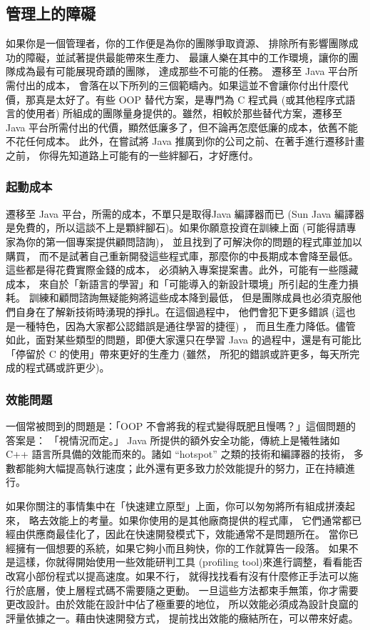 \subsection{管理上的障礙}
如果你是一個管理者，你的工作便是為你的團隊爭取資源、
排除所有影響團隊成功的障礙，並試著提供最能帶來生產力、
最讓人樂在其中的工作環境，讓你的團隊成為最有可能展現奇蹟的團隊，
達成那些不可能的任務。 遷移至 Java 平台所需付出的成本，
會落在以下所列的三個範疇內。如果這並不會讓你付出什麼代價，那真是太好了。有些
OOP 替代方案，是專門為 C 程式員 (或其他程序式語言的使用者)
所組成的團隊量身提供的。雖然，相較於那些替代方案，遷移至 Java
平台所需付出的代價，顯然低廉多了，但不論再怎麼低廉的成本，依舊不能不花任何成本。
此外，在嘗試將 Java 推廣到你的公司之前、在著手進行遷移計畫之前，
你得先知道路上可能有的一些絆腳石，才好應付。
\subsubsection{起動成本}
遷移至 Java 平台，所需的成本，不單只是取得Java 編譯器而已
(Sun Java 編譯器是免費的，所以這談不上是顆絆腳石)。如果你願意投資在訓練上面
(可能得請專家為你的第一個專案提供顧問諮詢)，
並且找到了可解決你的問題的程式庫並加以購買，
而不是試著自己重新開發這些程式庫，那麼你的中長期成本會降至最低。
這些都是得花費實際金錢的成本， 必須納入專案提案書。此外，可能有一些隱藏成本，
來自於「新語言的學習」和「可能導入的新設計環境」所引起的生產力損耗。
訓練和顧問諮詢無疑能夠將這些成本降到最低，
但是團隊成員也必須克服他們自身在了解新技術時湧現的掙扎。在這個過程中，
他們會犯下更多錯誤 (這也是一種特色，因為大家都公認錯誤是通往學習的捷徑) ，
而且生產力降低。儘管如此，面對某些類型的問題，即便大家還只在學習
Java 的過程中，還是有可能比「停留於 C 的使用」帶來更好的生產力 (雖然，
所犯的錯誤或許更多，每天所完成的程式碼或許更少)。
\subsubsection{效能問題}
一個常被問到的問題是：「OOP 不會將我的程式變得既肥且慢嗎？」這個問題的答案是：
「視情況而定。」 Java 所提供的額外安全功能，傳統上是犧牲諸如 C++
語言所具備的效能而來的。諸如 ``hotspot'' 之類的技術和編譯器的技術，
多數都能夠大幅提高執行速度；此外還有更多致力於效能提升的努力，正在持續進行。

如果你關注的事情集中在「快速建立原型」上面，你可以匆匆將所有組成拼湊起來，
略去效能上的考量。如果你使用的是其他廠商提供的程式庫，
它們通常都已經由供應商最佳化了，因此在快速開發模式下，效能通常不是問題所在。
當你已經擁有一個想要的系統，如果它夠小而且夠快，你的工作就算告一段落。
如果不是這樣，你就得開始使用一些效能研判工具
(profiling tool)來進行調整，看看能否改寫小部份程式以提高速度。如果不行，
就得找找看有沒有什麼修正手法可以施行於底層，使上層程式碼不需要隨之更動。
一旦這些方法都束手無策，你才需要更改設計。由於效能在設計中佔了極重要的地位，
所以效能必須成為設計良窳的評量依據之一。藉由快速開發方式，
提前找出效能的癥結所在，可以帶來好處。

